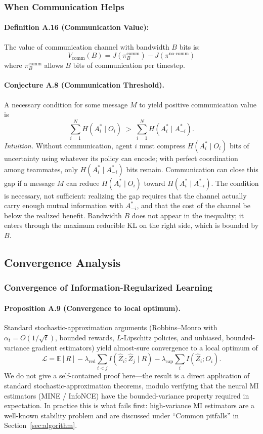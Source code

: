 \documentclass[10pt, letterpaper]{article}
\begin{document}
\subsubsection{When Communication Helps}

\paragraph{Definition A.16 (Communication Value):} The value of communication channel with bandwidth $B$ bits is:
\[V_{\text{comm}}(B) = J(\pi^{\text{comm}}_B) - J(\pi^{\text{no-comm}})\]
where $\pi^{\text{comm}}_B$ allows $B$ bits of communication per timestep.

\paragraph{Conjecture A.8 (Communication Threshold).} A necessary condition for some message $M$ to yield positive communication value is
\[\sum_{i=1}^N H(A_i^* \mid O_i) \;>\; \sum_{i=1}^N H(A_i^* \mid A_{-i}^*).\]
\emph{Intuition.} Without communication, agent $i$ must compress $H(A_i^*\mid O_i)$ bits of uncertainty using whatever its policy can encode; with perfect coordination among teammates, only $H(A_i^*\mid A_{-i}^*)$ bits remain. Communication can close this gap if a message $M$ can reduce $H(A_i^*\mid O_i)$ toward $H(A_i^*\mid A_{-i}^*)$. The condition is necessary, not sufficient: realizing the gap requires that the channel actually carry enough mutual information with $A_{-i}^*$, and that the cost of the channel be below the realized benefit. Bandwidth $B$ does not appear in the inequality; it enters through the maximum reducible KL on the right side, which is bounded by $B$.

\subsection{Convergence Analysis}

\subsubsection{Convergence of Information-Regularized Learning}

\paragraph{Proposition A.9 (Convergence to local optimum).} Standard stochastic-approximation arguments (Robbins--Monro with $\alpha_t = O(1/\sqrt{t})$, bounded rewards, $L$-Lipschitz policies, and unbiased, bounded-variance gradient estimators) yield almost-sure convergence to a local optimum of
\[\mathcal{L} = \mathbb{E}[R] - \lambda_\text{red} \sum_{i<j} I(\hat{Z}_i; \hat{Z}_j \mid R) - \lambda_\text{cap} \sum_i I(\hat{Z}_i; O_i).\]
We do not give a self-contained proof here---the result is a direct application of standard stochastic-approximation theorems, modulo verifying that the neural MI estimators (MINE / InfoNCE) have the bounded-variance property required in expectation. In practice this is what fails first: high-variance MI estimators are a well-known stability problem and are discussed under ``Common pitfalls'' in Section~\ref{sec:algorithm}.
\end{document}
